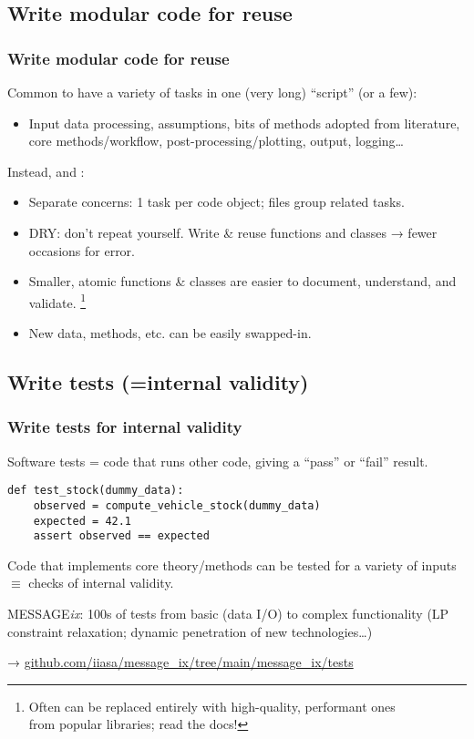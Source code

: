 \documentclass[12pt,aspectratio=169]{beamer}
\begin{document}
\subsection{Write modular code for reuse}
\begin{frame}
\frametitle{Write modular code for reuse}

Common to have a variety of tasks in one (very long) “script” (or a few):
\begin{itemize}
  \item Input data processing, assumptions, bits of methods adopted from literature, core methods/workflow, post-processing/plotting, output, logging…
\end{itemize}

\bigskip
Instead, and :
\begin{itemize}
  \item Separate concerns: 1 task per code object; files group related tasks.
  \item DRY: don't repeat yourself. Write \& reuse functions and classes → fewer occasions for error.
  \item Smaller, atomic functions \& classes are easier to document, understand, and validate.%
    \footnote{Often can be replaced entirely with high-quality, performant ones\\ \hspace{40mm} from popular libraries; read the docs!}
  \item New data, methods, etc. can be easily swapped-in.
\end{itemize}

\end{frame}

\subsection{Write tests (=internal validity)}
\begin{frame}[fragile]
\frametitle{Write tests for internal validity}

Software tests = code that runs other code, giving a “pass” or “fail” result.

\smallskip
\begin{verbatim}
def test_stock(dummy_data):
    observed = compute_vehicle_stock(dummy_data)
    expected = 42.1
    assert observed == expected
\end{verbatim}

\smallskip
Code that implements core theory/methods can be tested for a variety of inputs $\equiv$ checks of internal validity.

\medskip
MESSAGE\emph{ix}: 100s of tests from basic (data I/O) to complex functionality (LP constraint relaxation; dynamic penetration of new technologies…)

→ \href{https://github.com/iiasa/message_ix/tree/main/message_ix/tests}{github.com/iiasa/message\_ix/tree/main/message\_ix/tests}

\end{frame}
\end{document}
